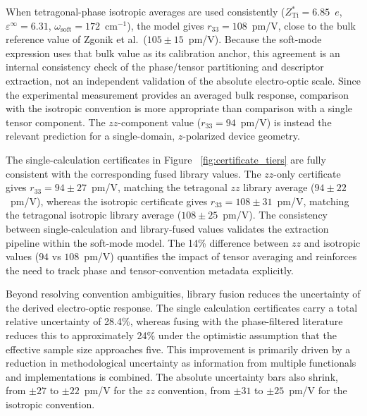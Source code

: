 \documentclass[twocolumn,superscriptaddress,amsmath,amssymb,longbibliography]{revtex4-2}
\begin{document}
When tetragonal-phase isotropic averages are used consistently
($Z^*_{\mathrm{Ti}} = 6.85$~$e$, $\varepsilon^\infty = 6.31$,
$\omega_{\mathrm{soft}} = 172$~cm$^{-1}$), the model gives
$r_{33} = 108$~pm/V, close to the bulk reference value of
Zgonik et al.\ ($105 \pm 15$~pm/V). Because the soft-mode expression uses that bulk value as its calibration anchor, this agreement is an internal consistency check of the phase/tensor partitioning and descriptor extraction, not an independent validation of the absolute electro-optic scale. Since the experimental measurement provides an averaged bulk response, comparison with the isotropic convention is more appropriate than comparison with a single tensor component. The $zz$-component
value ($r_{33} = 94$~pm/V) is instead the relevant prediction for a
single-domain, $z$-polarized device geometry.

The single-calculation certificates in Figure ~\ref{fig:certificate_tiers} are fully consistent with the corresponding fused library values.
The $zz$-only certificate gives $r_{33} = 94 \pm 27$~pm/V,
matching the tetragonal $zz$ library average ($94 \pm 22$~pm/V), whereas
the isotropic certificate gives $r_{33} = 108 \pm 31$~pm/V, matching
the tetragonal isotropic library average ($108 \pm 25$~pm/V). The consistency
between single-calculation and library-fused values validates the extraction pipeline within the
soft-mode model. The 14\% difference between $zz$ and isotropic values
($94$ vs $108$~pm/V) quantifies the impact of tensor averaging and
reinforces the need to track phase and tensor-convention metadata explicitly.

Beyond resolving convention ambiguities, library fusion reduces the uncertainty of the derived electro-optic response.
The single calculation certificates carry a total relative uncertainty of
28.4\%, whereas fusing with the phase-filtered literature reduces this
to approximately 24\% under the optimistic assumption that the effective sample size approaches five. This improvement is primarily driven by
a reduction in methodological uncertainty as information from multiple functionals and implementations is combined. The absolute uncertainty bars also shrink, from
$\pm 27$ to $\pm 22$~pm/V for the $zz$ convention, from $\pm 31$ to
$\pm 25$~pm/V for the isotropic convention.
\end{document}
